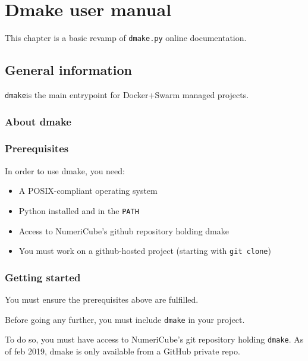 \chapter{Dmake user manual}
\label{chapter:dmakeman}

This chapter is a basic revamp of \texttt{dmake.py} online documentation.

\section{General information}

\texttt{dmake}\footnotemark is the main entrypoint for Docker+Swarm managed projects.

\subsection{About dmake}


\subsection{Prerequisites}

In order to use dmake, you need:

\begin{itemize}
    \item A POSIX-compliant operating system
    \item Python installed and in the \texttt{PATH}
    \item Access to NumeriCube's \gls{github} repository holding dmake
    \item You must work on a \gls{github}-hosted project (starting with \texttt{git clone})
\end{itemize}

\subsection{Getting started}

You must ensure the prerequisites above are fulfilled.

Before going any further, you must include \texttt{dmake} in your project.

To do so, you must have access to NumeriCube's git repository holding \texttt{dmake}. As of feb 2019, dmake is only available from a GitHub private repo.

